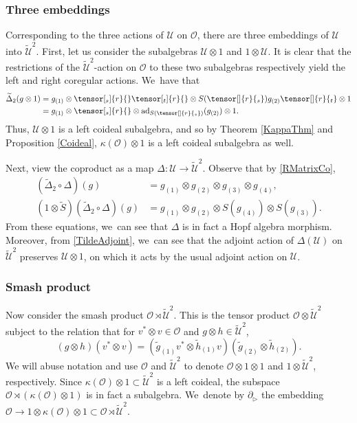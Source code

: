 \documentclass[JEP,XML,SOM,Unicode,published]{cedram}
\theoremstyle{definition}
\newcommand{\OO}{\mathcal{O}}
\newcommand{\UU}{\mathcal{U}}
\newcommand{\ad}{\mathrm{ad}}
\begin{document}
\subsubsection{Three embeddings}
Corresponding to the three actions of $\UU$ on $\OO$, there are three embeddings of $\UU$ into $\widetilde{\UU}^2$.
First, let us consider the subalgebras $\UU\otimes 1$ and $1\otimes\UU$.
It is clear that the restrictions of the $\widetilde{\UU}^2$-action on $\OO$ to these two subalgebras respectively yield the left and right coregular actions. We~have that\vspace*{-3pt}
\begin{equation}
\begin{aligned}
\widetilde{\Delta}_2(g\otimes 1)&=g_{(1)}\otimes \tensor[_s]{r}{}\tensor[_t]{r}{}\otimes S(\tensor[]{r}{_s})g_{(2)}\tensor[]{r}{_t}\otimes 1\\
&= g_{(1)}\otimes \tensor[_s]{r}{}\otimes \ad_{S(\tensor[]{r}{_s})} (g_{(2)})\otimes 1.
\end{aligned}
\label{SubCoproductL}
\end{equation}
Thus, $\UU\otimes 1$ is a left coideal subalgebra, and so by Theorem \ref{KappaThm} and Proposition \ref{Coideal}, $\kappa(\OO)\otimes 1$ is a left coideal subalgebra as well.

Next, view the coproduct as a map $\Delta:\UU\to\widetilde{\UU}^2$.
Observe that by \eqref{RMatrixCo},\vspace*{-3pt}
\begin{align}
\nonumber
(\widetilde{\Delta}_2\circ\Delta)(g)&=g_{(1)}\otimes g_{(2)}\otimes g_{(3)}\otimes g_{(4)},\\
\label{TildeAdjoint}
(1\otimes\widetilde{S})(\widetilde{\Delta}_2\circ\Delta)(g)&=g_{(1)}\otimes g_{(2)}\otimes S(g_{(4)})\otimes S(g_{(3)}).
\end{align}
From these equations, we~can see that $\Delta$ is in fact a Hopf algebra morphism.
Moreover, from \eqref{TildeAdjoint}, we~can see that the adjoint action of $\Delta(\UU)$ on $\widetilde{\UU}^2$ preserves $\UU\otimes 1$, on which it acts by the usual adjoint action on $\UU$.

\subsubsection{Smash product}
Now consider the smash product $\OO\rtimes\widetilde{\UU}^2$.
This is the tensor product $\OO\otimes\widetilde{\UU}^2$ subject to the relation that for $v^*\otimes v\in\OO$ and $g\otimes h\in\widetilde{\UU}^2$,\vspace*{-3pt}
\begin{equation}
(g\otimes h)(v^*\otimes v)=(\tilde{g}_{(1)}v^*\otimes\tilde{h}_{(1)}v)(\tilde{g}_{(2)}\otimes\tilde{h}_{(2)}).
\label{SmashProdDef}
\end{equation}
We will abuse notation and use $\OO$ and $\widetilde{\UU}^2$ to denote $\OO\otimes 1\otimes 1$ and $1\otimes \widetilde{\UU}^2$, respectively.
Since $\kappa(\OO)\otimes 1\subset\widetilde{\UU}^2$ is a left coideal, the subspace $\OO\rtimes(\kappa(\OO)\otimes 1)$ is in fact a subalgebra. We~denote by $\partial_\triangleright$ the embedding $\OO\to1\otimes\kappa(\OO)\otimes 1\subset\OO\rtimes\widetilde{\UU}^2$.
\end{document}

